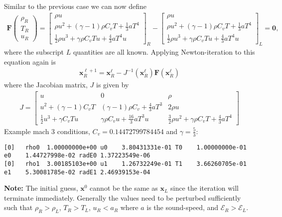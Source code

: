 \documentclass[10pt,letterpaper,notitlepage]{article}
\numberwithin{equation}{section}
\newcommand{\RadE}{\mathcal{E}}
\newcommand{\half}{\frac{1}{2}}
\newcommand{\beq}{\begin{equation*} \begin{aligned}}
\newcommand{\eeq}{\end{aligned}\end{equation*}}
\newcommand{\beqn}{\begin{equation}\begin{aligned}}
\newcommand{\eeqn}{\end{aligned}\end{equation}}
\begin{document}
\begin{appendices}
Similar to the previous case we can now define
\beqn 
\mathbf{F} 
\begin{pmatrix}
	\rho_R \\ T_R \\ u_R
\end{pmatrix}
=
\begin{bmatrix}
	\rho u \\
	\rho u^2   +  (\gamma-1) \rho C_v T 
	+\frac{1}{3} a T^4 \\
	\half \rho u^3 + \gamma \rho C_v T u + \frac{4}{3} a T^4 u  
\end{bmatrix}_R
-
\begin{bmatrix}
	\rho u \\
	\rho u^2   +  (\gamma-1) \rho C_v T 
	+\frac{1}{3} a T^4 \\
	\half \rho u^3 + \gamma \rho C_v T u + \frac{4}{3} a T^4 u  
\end{bmatrix}_L = \mathbf{0},
\eeqn 
where the subscript $L$ quantities are all known. Applying Newton-iteration to this equation again is 
\beq
\mathbf{x}_R^{\ell+1} = \mathbf{x}_R^\ell - J^{-1}(\mathbf{x}_R^\ell) \mathbf{F}(\mathbf{x}_R^\ell)
\eeq 
where the Jacobian matrix, $J$ is given by
\beqn 
J = 
\begin{bmatrix}
	u & 0 & \rho \\
	u^2 + (\gamma-1)C_v T & (\gamma-1)\rho C_v + \frac{4}{3}a T^3 & 2\rho u \\
	\half u^3 + \gamma C_v T u & \gamma \rho C_v u + \frac{16}{3} a T^3 u & \frac{3}{2} \rho u^2 + \gamma \rho C_v T + \frac{4}{3} a T^4 
\end{bmatrix}
\eeqn 
Example mach 3 conditions, $C_v = 0.14472799784454$ and $\gamma = \frac{5}{3}$:
{\smaller
\begin{verbatim}
[0]   rho0  1.00000000e+00 u0    3.80431331e-01 T0    1.00000000e-01 e0    1.44727998e-02 radE0 1.37223549e-06
[0]   rho1  3.00185103e+00 u1    1.26732249e-01 T1    3.66260705e-01 e1    5.30081785e-02 radE1 2.46939153e-04
\end{verbatim}
}
\vspace{1cm}
\noindent
\textbf{Note:} The initial guess, $\mathbf{x}^0$ cannot be the same as $\mathbf{x}_L$ since the iteration will terminate immediately. Generally the values need to be perturbed sufficiently such that $\rho_R > \rho_L$, $T_R > T_L$, $u_R < a_R$ where $a$ is the sound-speed, and $\RadE_R > \RadE_L$.

\end{appendices}
\end{document}
